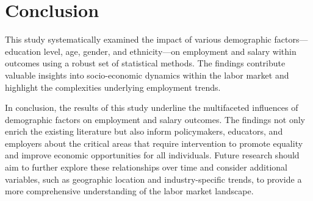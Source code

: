 \section{Conclusion}

This study systematically examined the impact of various demographic factors—education level, age, gender, and ethnicity—on employment and salary within outcomes using a robust set of statistical methods. The findings contribute valuable insights into socio-economic dynamics within the labor market and highlight the complexities underlying employment trends.

In conclusion, the results of this study underline the multifaceted influences of demographic factors on employment and salary outcomes. The findings not only enrich the existing literature but also inform policymakers, educators, and employers about the critical areas that require intervention to promote equality and improve economic opportunities for all individuals. Future research should aim to further explore these relationships over time and consider additional variables, such as geographic location and industry-specific trends, to provide a more comprehensive understanding of the labor market landscape.